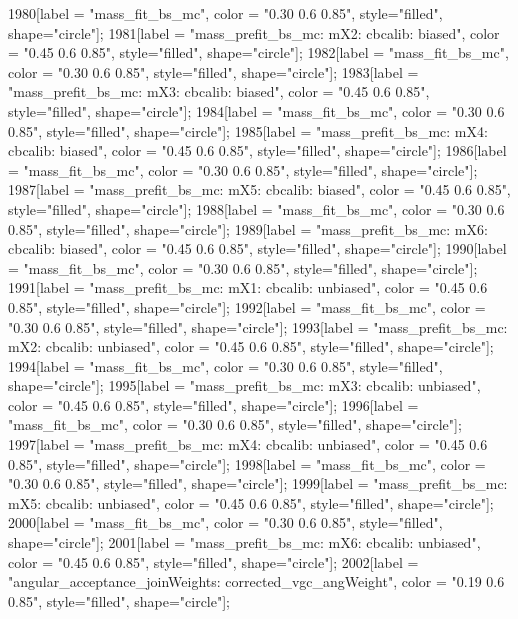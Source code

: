 {	1980[label = "mass_fit_bs_mc", color = "0.30 0.6 0.85", style="filled", shape="circle"];
	1981[label = "mass_prefit_bs_mc\nmassbin: mX2\nmassmodel: cbcalib\ntrigger: biased", color = "0.45 0.6 0.85", style="filled", shape="circle"];
	1982[label = "mass_fit_bs_mc", color = "0.30 0.6 0.85", style="filled", shape="circle"];
	1983[label = "mass_prefit_bs_mc\nmassbin: mX3\nmassmodel: cbcalib\ntrigger: biased", color = "0.45 0.6 0.85", style="filled", shape="circle"];
	1984[label = "mass_fit_bs_mc", color = "0.30 0.6 0.85", style="filled", shape="circle"];
	1985[label = "mass_prefit_bs_mc\nmassbin: mX4\nmassmodel: cbcalib\ntrigger: biased", color = "0.45 0.6 0.85", style="filled", shape="circle"];
	1986[label = "mass_fit_bs_mc", color = "0.30 0.6 0.85", style="filled", shape="circle"];
	1987[label = "mass_prefit_bs_mc\nmassbin: mX5\nmassmodel: cbcalib\ntrigger: biased", color = "0.45 0.6 0.85", style="filled", shape="circle"];
	1988[label = "mass_fit_bs_mc", color = "0.30 0.6 0.85", style="filled", shape="circle"];
	1989[label = "mass_prefit_bs_mc\nmassbin: mX6\nmassmodel: cbcalib\ntrigger: biased", color = "0.45 0.6 0.85", style="filled", shape="circle"];
	1990[label = "mass_fit_bs_mc", color = "0.30 0.6 0.85", style="filled", shape="circle"];
	1991[label = "mass_prefit_bs_mc\nmassbin: mX1\nmassmodel: cbcalib\ntrigger: unbiased", color = "0.45 0.6 0.85", style="filled", shape="circle"];
	1992[label = "mass_fit_bs_mc", color = "0.30 0.6 0.85", style="filled", shape="circle"];
	1993[label = "mass_prefit_bs_mc\nmassbin: mX2\nmassmodel: cbcalib\ntrigger: unbiased", color = "0.45 0.6 0.85", style="filled", shape="circle"];
	1994[label = "mass_fit_bs_mc", color = "0.30 0.6 0.85", style="filled", shape="circle"];
	1995[label = "mass_prefit_bs_mc\nmassbin: mX3\nmassmodel: cbcalib\ntrigger: unbiased", color = "0.45 0.6 0.85", style="filled", shape="circle"];
	1996[label = "mass_fit_bs_mc", color = "0.30 0.6 0.85", style="filled", shape="circle"];
	1997[label = "mass_prefit_bs_mc\nmassbin: mX4\nmassmodel: cbcalib\ntrigger: unbiased", color = "0.45 0.6 0.85", style="filled", shape="circle"];
	1998[label = "mass_fit_bs_mc", color = "0.30 0.6 0.85", style="filled", shape="circle"];
	1999[label = "mass_prefit_bs_mc\nmassbin: mX5\nmassmodel: cbcalib\ntrigger: unbiased", color = "0.45 0.6 0.85", style="filled", shape="circle"];
	2000[label = "mass_fit_bs_mc", color = "0.30 0.6 0.85", style="filled", shape="circle"];
	2001[label = "mass_prefit_bs_mc\nmassbin: mX6\nmassmodel: cbcalib\ntrigger: unbiased", color = "0.45 0.6 0.85", style="filled", shape="circle"];
	2002[label = "angular_acceptance_joinWeights\nwflag: corrected_vgc_angWeight", color = "0.19 0.6 0.85", style="filled", shape="circle"];
}
